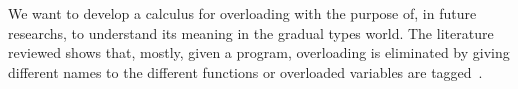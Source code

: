 \documentclass{article}
\begin{document}
We want to develop a calculus for overloading with the purpose of, in future researchs, to understand its meaning in the gradual types world. The literature reviewed shows that, mostly, given a program, overloading is eliminated  by giving different names to the different functions or overloaded variables are tagged~\cite{BETTINI2009261, CardelliWegner, scott, OOSOFHl, Nipkow:1993:TCT:158511.158698, Odersky:1995:SLO:224164.224195,Ribeiro2013,wadlerBlott:popl89}.                                                                                                                                                                                                                                                                                                                                                                                                                                                                                                                                                                                                                                                                                                                                                                                                                                                                                                                                                                                                                                                                                                                                                                                                                                                                                                                                                                                                                                                                                                                                                                                                                                                                                                                                                                                                                                                                                                                                                                                                                                                                                                                                                                                                                                                                                                                                                                                                                                                                                                                                                                                                                                                                                                                                                                                                                                                                                                                                                                                      
\end{document}
